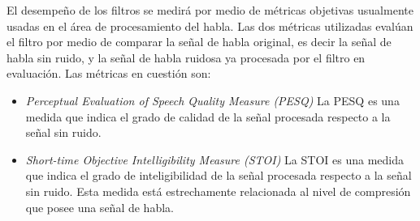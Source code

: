 El desempeño de los filtros se medirá por medio de métricas objetivas usualmente usadas en el área de procesamiento del habla. Las dos métricas utilizadas evalúan el filtro por medio de comparar la señal de habla original, es decir la señal de habla sin ruido, y la señal de habla ruidosa ya procesada por el filtro en evaluación. Las métricas en cuestión son:
\begin{itemize}
	\item \emph{Perceptual Evaluation of Speech Quality Measure (PESQ)} \cite{perceptual_evaluation_of_speech_quality_a_new_method_for_speech_quality_assessment_of_telephone_networks_and_codecs} La PESQ es una medida que indica el grado de calidad de la señal procesada respecto a la señal sin ruido.
	\item \emph{Short-time Objective Intelligibility Measure (STOI)} \cite{a_short_time_objective_intelligibility_measure_for_time_frequency_weighted_noisy_speech} La STOI es una medida que indica el grado de inteligibilidad de la señal procesada respecto a la señal sin ruido. Esta medida está estrechamente relacionada al nivel de compresión que posee una señal de habla.
\end{itemize}